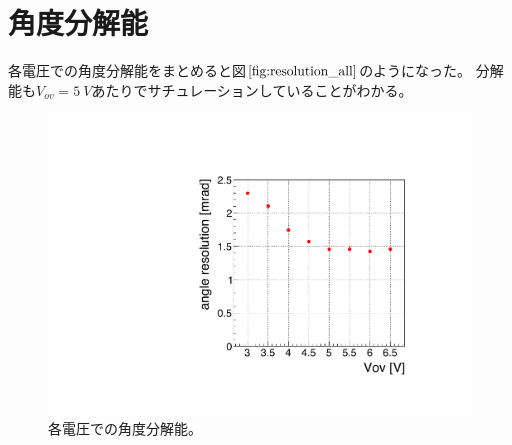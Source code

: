 \documentclass[uplatex, titlepage, dvipdfmx, 12pt, a4paper]{jsreport}
\begin{document}
  \section{角度分解能}
    各電圧での角度分解能をまとめると図$\ref{fig:resolution_all}$のようになった。
    分解能も$V_{ov}=\SI{5}{V}$あたりでサチュレーションしていることがわかる。
    \begin{figure}[htbp]
      \begin{center} 
        \includegraphics[scale=0.4, clip]{image/resolutin_allV.pdf}
        \caption{各電圧での角度分解能。} 
        \label{fig:resolution_all} 
      \end{center}
    \end{figure}
\end{document}

